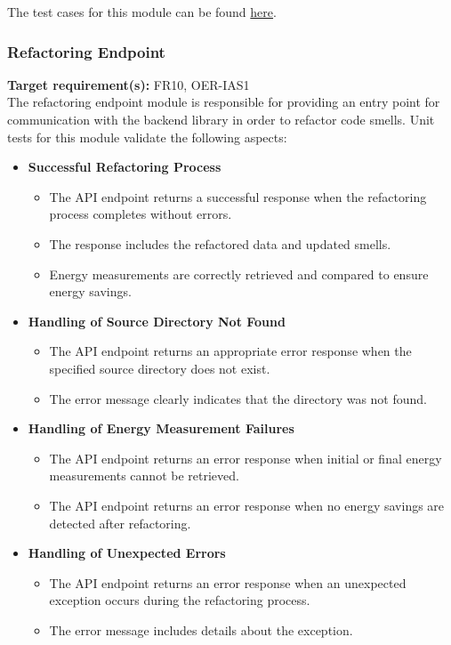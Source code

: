 \documentclass[12pt, titlepage]{article}
\begin{document}
\noindent The test cases for this module can be found \href{https://github.com/ssm-lab/capstone--source-code-optimizer/blob/new-poc/tests/api/test_detect_route.py}{here}.

\subsubsection{Refactoring Endpoint}

\textbf{Target requirement(s):} FR10, OER-IAS1~\cite{SRS} \\

\noindent
The refactoring endpoint module is responsible for providing an entry point for communication with the backend library in order to refactor code smells. Unit tests for this module validate the following aspects:

\begin{itemize}
  \item \textbf{Successful Refactoring Process}
  \begin{itemize}
    \item The API endpoint returns a successful response when the refactoring process completes without errors.
    \item The response includes the refactored data and updated smells.
    \item Energy measurements are correctly retrieved and compared to ensure energy savings.
  \end{itemize}

  \item \textbf{Handling of Source Directory Not Found}
  \begin{itemize}
      \item The API endpoint returns an appropriate error response when the specified source directory does not exist.
      \item The error message clearly indicates that the directory was not found.
  \end{itemize}

  \item \textbf{Handling of Energy Measurement Failures}
  \begin{itemize}
      \item The API endpoint returns an error response when initial or final energy measurements cannot be retrieved.
      \item The API endpoint returns an error response when no energy savings are detected after refactoring.
  \end{itemize}

  \item \textbf{Handling of Unexpected Errors}
  \begin{itemize}
      \item The API endpoint returns an error response when an unexpected exception occurs during the refactoring process.
      \item The error message includes details about the exception.
  \end{itemize}
\end{itemize}
\end{document}
